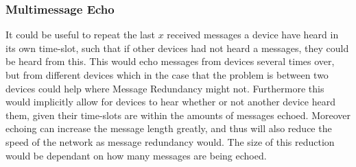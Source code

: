 \subsubsection*{Multimessage Echo}
It could be useful to repeat the last $x$ received messages a device have heard in its own time-slot, such that if other devices had not heard a messages, they could be heard from this.
This would echo messages from devices several times over, but from different devices which in the case that the problem is between two devices could help where Message Redundancy might not.  
Furthermore this would implicitly allow for devices to hear whether or not another device heard them, given their time-slots are within the amounts of messages echoed.
Moreover echoing can increase the message length greatly, and thus will also reduce the speed of the network as message redundancy would.
The size of this reduction would be dependant on how many messages are being echoed. 